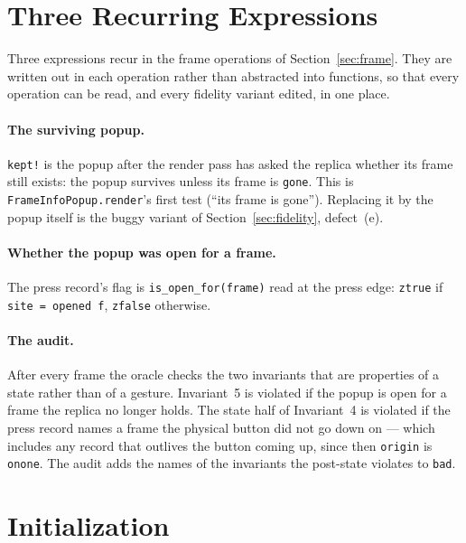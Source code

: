 \documentclass[a4paper,10pt,fleqn]{article}
\begin{document}
\section{Three Recurring Expressions}

Three expressions recur in the frame operations of Section~\ref{sec:frame}.
They are written out in each operation rather than abstracted into functions,
so that every operation can be read, and every fidelity variant edited, in one
place.

\paragraph{The surviving popup.}
\texttt{kept!} is the popup after the render pass has asked the replica
whether its frame still exists: the popup survives unless its frame is
\texttt{gone}.  This is \texttt{FrameInfoPopup.render}'s first test (``its frame
is gone'').  Replacing it by the popup itself is the buggy variant of
Section~\ref{sec:fidelity}, defect~(e).

\paragraph{Whether the popup was open for a frame.}
The press record's flag is \texttt{is\_open\_for(frame)} read at the press
edge: \texttt{ztrue} if \texttt{site~=~opened~f}, \texttt{zfalse} otherwise.

\paragraph{The audit.}
After every frame the oracle checks the two invariants that are properties of a
state rather than of a gesture.  Invariant~5 is violated if the popup is open
for a frame the replica no longer holds.  The state half of Invariant~4 is
violated if the press record names a frame the physical button did not go down
on --- which includes any record that outlives the button coming up, since then
\texttt{origin} is \texttt{onone}.  The audit adds the names of the invariants
the post-state violates to \texttt{bad}.

\section{Initialization}
\end{document}
